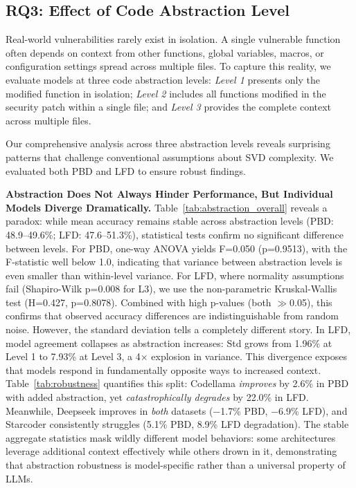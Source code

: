 \documentclass[lettersize,journal]{IEEEtran}
\begin{document}
\subsection{RQ3: Effect of Code Abstraction Level}
\label{section:rq3}

Real-world vulnerabilities rarely exist in isolation. A single vulnerable function often depends on context from other functions, global variables, macros, or configuration settings spread across multiple files. To capture this reality, we evaluate models at three code abstraction levels: \textit{Level 1} presents only the modified function in isolation; \textit{Level 2} includes all functions modified in the security patch within a single file; and \textit{Level 3} provides the complete context across multiple files.

Our comprehensive analysis across three abstraction levels reveals surprising patterns that challenge conventional assumptions about \gls{SVD} complexity. We evaluated both PBD and LFD to ensure robust findings.



\textbf{Abstraction Does Not Always Hinder Performance, But Individual Models Diverge Dramatically.} Table~\ref{tab:abstraction_overall} reveals a paradox: while mean accuracy remains stable across abstraction levels (PBD: 48.9--49.6\%; LFD: 47.6--51.3\%), statistical tests confirm no significant difference between levels. For PBD, one-way ANOVA yields F=0.050 (p=0.9513), with the F-statistic well below 1.0, indicating that variance between abstraction levels is even smaller than within-level variance. For LFD, where normality assumptions fail (Shapiro-Wilk p=0.008 for L3), we use the non-parametric Kruskal-Wallis test (H=0.427, p=0.8078). Combined with high p-values (both $\gg$0.05), this confirms that observed accuracy differences are indistinguishable from random noise. However, the standard deviation tells a completely different story. In LFD, model agreement collapses as abstraction increases: Std grows from 1.96\% at Level 1 to 7.93\% at Level 3, a 4× explosion in variance. This divergence exposes that models respond in fundamentally opposite ways to increased context. Table~\ref{tab:robustness} quantifies this split: Codellama \textit{improves} by 2.6\% in PBD with added abstraction, yet \textit{catastrophically degrades} by 22.0\% in LFD. Meanwhile, Deepseek improves in \textit{both} datasets (−1.7\% PBD, −6.9\% LFD), and Starcoder consistently struggles (5.1\% PBD, 8.9\% LFD degradation). The stable aggregate statistics mask wildly different model behaviors: some architectures leverage additional context effectively while others drown in it, demonstrating that abstraction robustness is model-specific rather than a universal property of LLMs.
\end{document}
